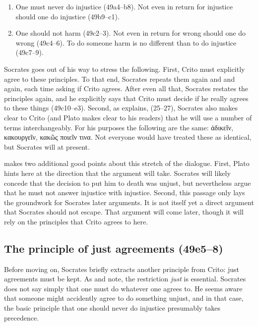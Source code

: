 \documentclass[12pt,letterpaper]{article}
\begin{document}
\begin{enumerate}

    \item One must never do injustice (49a4--b8). Not even in return for injustice should one do injustice (49b9--c1).

    \item One should not harm (49c2--3). Not even in return for wrong should one do wrong (49c4--6). To do someone harm is no different than to do injustice (49c7--9).

\end{enumerate}

Socrates goes out of his way to stress the following. First, Crito must explicitly agree to these principles. To that end, Socrates repeats them again and and again, each time asking if Crito agrees. After even all that, Socrates restates the principles again, and he explicitly says that Crito must decide if he really agrees to these things (49c10--e3). Second, as \cite{kraut1984} explains, (25--27), Socrates also makes clear to Crito (and Plato makes clear to his readers) that he will use a number of terms interchangeably. For his purposes the following are the same: \textgreek{ ἀδικεῖν}, \textgreek{κακουργεῖν}, \textgreek{κακῶς ποιεῖν τινα}. Not everyone would have treated these as identical, but Socrates will at present.

\cite{kraut1984} makes two additional good points about this stretch of
the dialogue. First, Plato hints here at the direction that the argument
will take. Socrates will likely concede that the decision to put him to
death was unjust, but nevertheless argue that he must not answer injustice
with injustice. Second, this passage only lays the groundwork for Socrates
later arguments. It is not itself yet a direct argument that Socrates
should not escape. That argument will come later, though it will rely on
the principles that Crito agrees to here.


\subsection*{The principle of just agreements (49e5--8)}

Before moving on, Socrates briefly extracts another principle from Crito: just agreements must be kept. As \cite{kraut1984} and \cite{brickhouse-smith2004-plato-trial-of-socrates} note, the restriction \emph{just} is essential. Socrates does not say simply that one must do whatever one agrees to. He seems aware that someone might accidently agree to do something unjust, and in that case, the basic principle that one should never do injustice presumably takes precedence.
\end{document}
